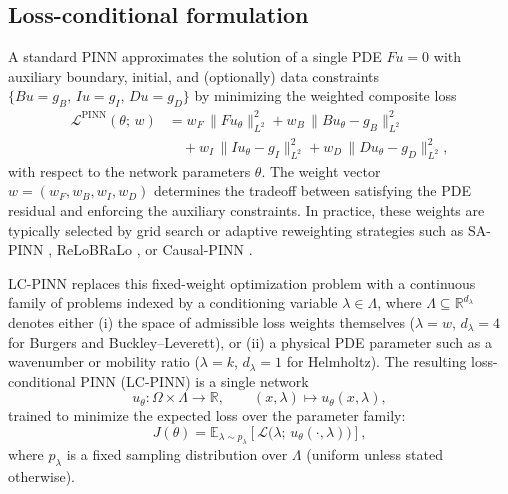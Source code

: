 \documentclass{article}
\theoremstyle{plain}
\theoremstyle{definition}
\theoremstyle{remark}
\begin{document}
\subsection{Loss-conditional formulation}

A standard PINN \citep{raissi2019} approximates the solution of a
single PDE $F u = 0$ with auxiliary boundary, initial, and
(optionally) data constraints
$\{B u = g_B,\, I u = g_I,\, D u = g_D\}$ by minimizing the weighted
composite loss
\begin{equation}
\begin{aligned}
   \mathcal{L}^{\mathrm{PINN}}(\theta;\, w)
   &=
     w_F \,\| F u_\theta \|_{L^2}^2
     + w_B \,\| B u_\theta - g_B \|_{L^2}^2 \\
   &\quad
     + w_I \,\| I u_\theta - g_I \|_{L^2}^2
     + w_D \,\| D u_\theta - g_D \|_{L^2}^2 ,
\end{aligned}
\label{eq:standard-pinn}
\end{equation}
with respect to the network parameters $\theta$. The weight vector
$w = (w_F, w_B, w_I, w_D)$ determines the tradeoff between satisfying
the PDE residual and enforcing the auxiliary constraints. In practice,
these weights are typically selected by grid search or adaptive
reweighting strategies such as SA-PINN \citep{mcclenny2020},
ReLoBRaLo \citep{bischof2021}, or Causal-PINN
\citep{wang2024}.

LC-PINN replaces this fixed-weight optimization problem with a
continuous family of problems indexed by a conditioning variable
$\lambda \in \Lambda$, where
$\Lambda \subseteq \mathbb{R}^{d_\lambda}$ denotes either
(i) the space of admissible loss weights themselves
($\lambda = w$, $d_\lambda = 4$ for Burgers and Buckley--Leverett), or
(ii) a physical PDE parameter such as a wavenumber or mobility ratio
($\lambda = k$, $d_\lambda = 1$ for Helmholtz). The resulting
loss-conditional PINN (LC-PINN) is a single network
\begin{equation}
   u_\theta : \Omega \times \Lambda \to \mathbb{R},
   \qquad
   (x,\lambda) \mapsto u_\theta(x,\lambda),
\label{eq:lc-network}
\end{equation}
trained to minimize the expected loss over the parameter family:
\begin{equation}
   J(\theta)
   =
   \mathbb{E}_{\lambda \sim p_\lambda}
   \left[
       \mathcal{L}\bigl(
           \lambda;\,
           u_\theta(\cdot,\lambda)
       \bigr)
   \right],
\label{eq:lc-objective}
\end{equation}
where $p_\lambda$ is a fixed sampling distribution over $\Lambda$
(uniform unless stated otherwise).
\end{document}
